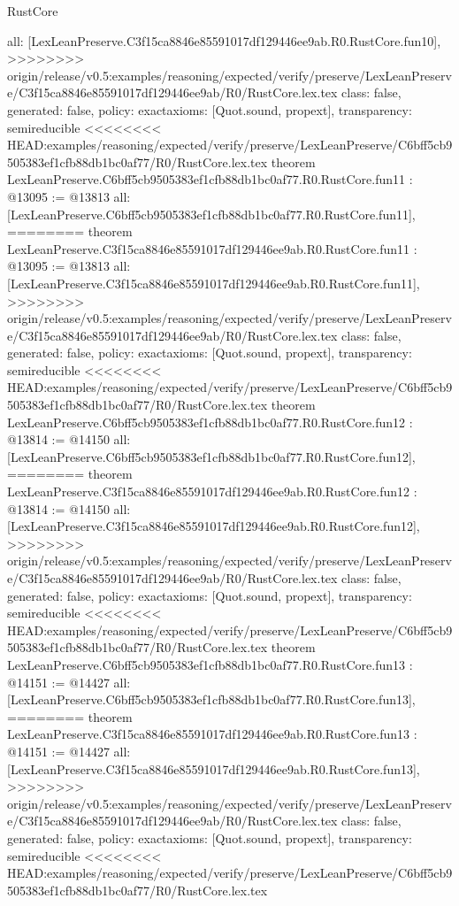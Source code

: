 \begin{lexlean}{RustCore}
\begin{coremodule}
{\begin{coremodule}
{{{{{{{{{{{{{{  all: [LexLeanPreserve.C3f15ca8846e85591017df129446ee9ab.R0.RustCore.fun10],
>>>>>>>> origin/release/v0.5:examples/reasoning/expected/verify/preserve/LexLeanPreserve/C3f15ca8846e85591017df129446ee9ab/R0/RustCore.lex.tex
  class: false,
  generated: false,
  policy: exact{axioms: [Quot.sound, propext]},
  transparency: semireducible
}
<<<<<<<< HEAD:examples/reasoning/expected/verify/preserve/LexLeanPreserve/C6bff5cb9505383ef1cfb88db1bc0af77/R0/RustCore.lex.tex
theorem LexLeanPreserve.C6bff5cb9505383ef1cfb88db1bc0af77.R0.RustCore.fun11 : @13095 := @13813 {
  all: [LexLeanPreserve.C6bff5cb9505383ef1cfb88db1bc0af77.R0.RustCore.fun11],
========
theorem LexLeanPreserve.C3f15ca8846e85591017df129446ee9ab.R0.RustCore.fun11 : @13095 := @13813 {
  all: [LexLeanPreserve.C3f15ca8846e85591017df129446ee9ab.R0.RustCore.fun11],
>>>>>>>> origin/release/v0.5:examples/reasoning/expected/verify/preserve/LexLeanPreserve/C3f15ca8846e85591017df129446ee9ab/R0/RustCore.lex.tex
  class: false,
  generated: false,
  policy: exact{axioms: [Quot.sound, propext]},
  transparency: semireducible
}
<<<<<<<< HEAD:examples/reasoning/expected/verify/preserve/LexLeanPreserve/C6bff5cb9505383ef1cfb88db1bc0af77/R0/RustCore.lex.tex
theorem LexLeanPreserve.C6bff5cb9505383ef1cfb88db1bc0af77.R0.RustCore.fun12 : @13814 := @14150 {
  all: [LexLeanPreserve.C6bff5cb9505383ef1cfb88db1bc0af77.R0.RustCore.fun12],
========
theorem LexLeanPreserve.C3f15ca8846e85591017df129446ee9ab.R0.RustCore.fun12 : @13814 := @14150 {
  all: [LexLeanPreserve.C3f15ca8846e85591017df129446ee9ab.R0.RustCore.fun12],
>>>>>>>> origin/release/v0.5:examples/reasoning/expected/verify/preserve/LexLeanPreserve/C3f15ca8846e85591017df129446ee9ab/R0/RustCore.lex.tex
  class: false,
  generated: false,
  policy: exact{axioms: [Quot.sound, propext]},
  transparency: semireducible
}
<<<<<<<< HEAD:examples/reasoning/expected/verify/preserve/LexLeanPreserve/C6bff5cb9505383ef1cfb88db1bc0af77/R0/RustCore.lex.tex
theorem LexLeanPreserve.C6bff5cb9505383ef1cfb88db1bc0af77.R0.RustCore.fun13 : @14151 := @14427 {
  all: [LexLeanPreserve.C6bff5cb9505383ef1cfb88db1bc0af77.R0.RustCore.fun13],
========
theorem LexLeanPreserve.C3f15ca8846e85591017df129446ee9ab.R0.RustCore.fun13 : @14151 := @14427 {
  all: [LexLeanPreserve.C3f15ca8846e85591017df129446ee9ab.R0.RustCore.fun13],
>>>>>>>> origin/release/v0.5:examples/reasoning/expected/verify/preserve/LexLeanPreserve/C3f15ca8846e85591017df129446ee9ab/R0/RustCore.lex.tex
  class: false,
  generated: false,
  policy: exact{axioms: [Quot.sound, propext]},
  transparency: semireducible
}
<<<<<<<< HEAD:examples/reasoning/expected/verify/preserve/LexLeanPreserve/C6bff5cb9505383ef1cfb88db1bc0af77/R0/RustCore.lex.tex
}}}}}}}}}}}}}}}}
\end{coremodule}}
\end{coremodule}
\end{lexlean}
